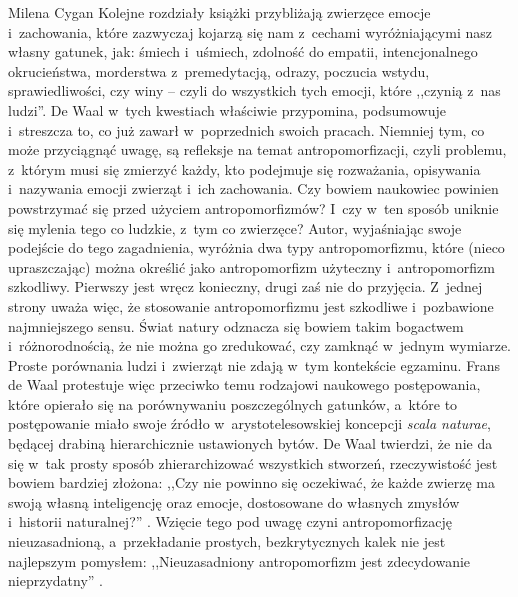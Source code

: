 \begin{newrevplenv}{Milena Cygan}
Kolejne rozdziały książki przybliżają zwierzęce emocje i~zachowania, które zazwyczaj kojarzą się nam z~cechami wyróżniającymi nasz własny gatunek, jak: śmiech i~uśmiech, zdolność do empatii, intencjonalnego okrucieństwa, morderstwa z~premedytacją, odrazy, poczucia wstydu, sprawiedliwości, czy winy -- czyli do wszystkich tych emocji, które ,,czynią z~nas ludzi''. De Waal w~tych kwestiach właściwie przypomina, podsumowuje i~streszcza to, co już zawarł w~poprzednich swoich pracach. Niemniej tym, co może przyciągnąć uwagę, są refleksje na temat antropomorfizacji, czyli problemu, z~którym musi się zmierzyć każdy, kto podejmuje się rozważania, opisywania i~nazywania emocji zwierząt i~ich zachowania. Czy bowiem naukowiec powinien powstrzymać się przed użyciem antropomorfizmów? I~czy w~ten sposób uniknie się mylenia tego co ludzkie, z~tym co zwierzęce? Autor, wyjaśniając swoje podejście do tego zagadnienia, wyróżnia dwa typy antropomorfizmu, które (nieco upraszczając) można określić jako antropomorfizm użyteczny i~antropomorfizm szkodliwy. Pierwszy jest wręcz konieczny, drugi zaś nie do przyjęcia. Z~jednej strony uważa więc, że stosowanie antropomorfizmu jest szkodliwe i~pozbawione najmniejszego sensu. Świat natury odznacza się bowiem takim bogactwem i~różnorodnością, że nie można go zredukować, czy zamknąć w~jednym wymiarze. Proste porównania ludzi i~zwierząt nie zdają w~tym kontekście egzaminu. Frans de Waal protestuje więc przeciwko temu rodzajowi naukowego postępowania, które opierało się na porównywaniu poszczególnych gatunków, a~które to postępowanie miało swoje źródło w~arystotelesowskiej koncepcji \textit{scala naturae}, będącej drabiną hierarchicznie ustawionych bytów. De Waal twierdzi, że nie da się w~tak prosty sposób zhierarchizować wszystkich stworzeń, rzeczywistość jest bowiem bardziej złożona: ,,Czy nie powinno się oczekiwać, że każde zwierzę ma swoją własną inteligencję oraz emocje, dostosowane do własnych zmysłów i~historii naturalnej?''
\parencite[][s.~64]{waal_ostatni_2019}. %
 Wzięcie tego pod uwagę czyni antropomorfizację nieuzasadnioną, a~przekładanie prostych, bezkrytycznych kalek nie jest najlepszym pomysłem: ,,Nieuzasadniony antropomorfizm jest zdecydowanie nieprzydatny'' 
\parencite[][s.~64]{waal_ostatni_2019}.%



\end{newrevplenv}
